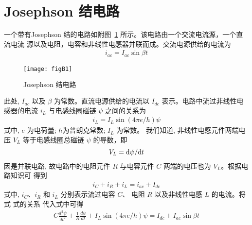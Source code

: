 \documentclass[withoutpreface,bwprint]{cumcmthesis} %
\begin{document}
\begin{appendices}
\begin{lstlisting}[language=matlab]
 \end{lstlisting}

 \section{Josephson 结电路}
 \def\thesection{B}
 \renewcommand{\theequation}{B\arabic{equation}}
 \renewcommand{\thefigure}{B\arabic{figure}}
 \setcounter{equation}{0}
 \setcounter{figure}{0}

一个带有Josephson 结的电路如附图~\ref{figB1} 所示。该电路由一个交流电流源，一个直流电流
源以及电阻，电容和非线性电感器并联而成。交流电源供给的电流为
\begin{align}
\label{eqB1}
i_{a c}=I_{ac} \sin \beta t
\end{align}

\begin{figure}[h!t]
    \center
 \centerline{\texttt{[image: figB1]}}
    \caption{Josephson 结电路}
    \label{figB1}
    \end{figure}

此处,  $I_{a c}$  以及 $ \beta $ 为常数。直流电源供给的电流以  $I_{d c} $ 表示。电路中流过非线性电感器的电流 $ i_{L}$  与电感线圈磁链 $ \psi$  之间的关系为
\begin{align}
\label{eqB2}
i_{L}=I_{L} \sin (4 \pi e / h) \psi
\end{align}
式中, $ e  $ 为电荷量; $ h  $为普朗克常数;  $I_{L} $ 为常数。
我们知道, 非线性电感元件两端电压 $ V_{L} $ 等于电感线圈总磁链 $ \psi $ 的导数，即
\begin{align}
\label{eqB3}
V_{L}={\rm d} \psi / {\rm d} t
\end{align}
因是并联电路, 故电路中的电阻元件 $ R $ 与电容元件 $ C$  两端的电压也为 $ V_{L}  $。根据电路知识可 得到
\begin{align}
\label{eqB4}
i_{C}+i_{R}+i_{L}=i_{a c}+I_{d c}
\end{align}
式中,  $i_{C} $、$ i_{R} $ 和 $ i_{L} $ 分别表示流过电容 $ C $、  电阻 $ R $ 以及非线性电感  $L$  的电流。将式 式的关系 代入式中可得
\begin{align}
\label{eqB5}
C \frac{d^{2} \psi}{d t^{2}}+\frac{1}{R} \frac{d \psi}{d t}+I_{L} \sin (4 \pi e / h) \psi=I_{d c}+I_{a c} \sin \beta t
\end{align}


\end{appendices}
\end{document}
